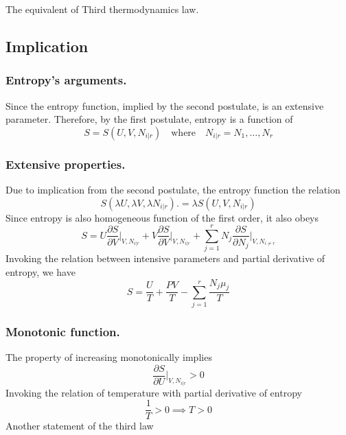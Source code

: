 \documentclass[../../../Main.tex]{subfiles}
\begin{document}
The equivalent of Third thermodynamics law.

\subsection*{Implication}
\subsubsection*{Entropy's arguments.} Since the entropy function, implied by the second postulate, is an extensive parameter. Therefore, by the first postulate, entropy is a function of 
\begin{equation*}
    S=S(U,V,N_{i|r})\quad\text{where}\quad N_{i|r}=N_1,\dots,N_r
\end{equation*}

\subsubsection*{Extensive properties.} Due to implication from the second postulate, the entropy function the relation 
\begin{equation*}
    S(\lambda U, \lambda V, \lambda N_{i|r} ). = \lambda S(U, V, N_{i|r} )
\end{equation*}
Since entropy is also homogeneous function of the first order, it also obeys 
\begin{equation*}
    S=U\frac{\partial S}{\partial V}\bigg|_{V,N_{i|r}}+V\frac{\partial S}{\partial V}\bigg|_{V,N_{i|r}}+ \sum_{j=1}^{r} N_j\frac{\partial S}{\partial N_j}\bigg|_{V,N_{i\neq r}}
\end{equation*}
Invoking the relation between intensive parameters and partial derivative of entropy, we have 
\begin{equation*}
    S=\frac{U}{T}+\frac{PV}{T}-\sum_{j=1}^{r}\frac{N_j\mu_j}{T}
\end{equation*}

\subsubsection*{Monotonic function.} The property of increasing monotonically implies
\begin{equation*}
    \frac{\partial S}{\partial U}\bigg|_{V,N_{i|r}}>0
\end{equation*}
Invoking the relation of temperature with partial derivative of entropy
\begin{equation*}
    \frac{1}{T}>0\implies T>0
\end{equation*}
Another statement of the third law
\end{document}
